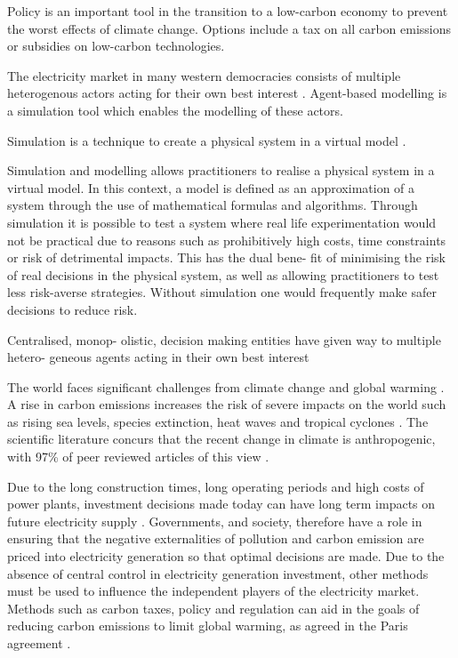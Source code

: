 
Policy is an important tool in the transition to a low-carbon economy to prevent the worst effects of climate change. Options include a tax on all carbon emissions or subsidies on low-carbon technologies. 

The electricity market in many western democracies consists of multiple heterogenous actors acting for their own best interest \cite{Most2010}. Agent-based modelling is a simulation tool which enables the modelling of these actors. 

Simulation is a technique to create a physical system in a virtual model \cite{Forshaw2016}. 






 Simulation and modelling allows practitioners to realise a physical system in a virtual model. In this context, a model is defined as an approximation of a system through the use of mathematical formulas and algorithms. Through simulation it is possible to test a system where real life experimentation would not be practical due to reasons such as prohibitively high costs, time constraints or risk of detrimental impacts. This has the dual bene- fit of minimising the risk of real decisions in the physical system, as well as allowing practitioners to test less risk-averse strategies. Without simulation one would frequently make safer decisions to reduce risk.





Centralised, monop- olistic, decision making entities have given way to multiple hetero- geneous agents acting in their own best interest





The world faces significant challenges from climate change and global warming \cite{Masson-Delmotte2018}. A rise in carbon emissions increases the risk of severe impacts on the world such as rising sea levels, species extinction, heat waves and tropical cyclones \cite{IPCC2014}. The scientific literature concurs that the recent change in climate is anthropogenic, with 97\% of peer reviewed articles of this view \cite{Cook2013}.  

 
Due to the long construction times, long operating periods and high costs of power plants, investment decisions made today can have long term impacts on future electricity supply \cite{Chappin2017}. Governments, and society, therefore have a role in ensuring that the negative externalities of pollution and carbon emission are priced into electricity generation so that optimal decisions are made. Due to the absence of central control in electricity generation investment, other methods must be used to influence the independent players of the electricity market. Methods such as carbon taxes, policy and regulation can aid in the goals of reducing carbon emissions to limit global warming, as agreed in the Paris agreement \cite{May2002}.

